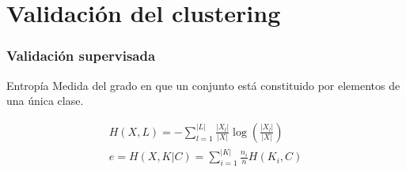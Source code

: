 \section{Validación del clustering}\label{sec:validation}

\begin{frame}
    \frametitle{Validación supervisada}

    \pause
    \begin{block}{Entropía}
        Medida del grado en que un conjunto está constituido por elementos de una única clase.
    \end{block}

    \pause
    \begin{gather*}
        H(X, L) = -\sum_{l=1}^{|L|}{\frac{|X_l|}{|X|}\log{\left( \frac{|X_l|}{|X|} \right)}} \\
        e = H(X, K|C) = \sum_{i=1}^{|K|}{\frac{n_i}{n}H(K_i,C)}
    \end{gather*}

\end{frame}

